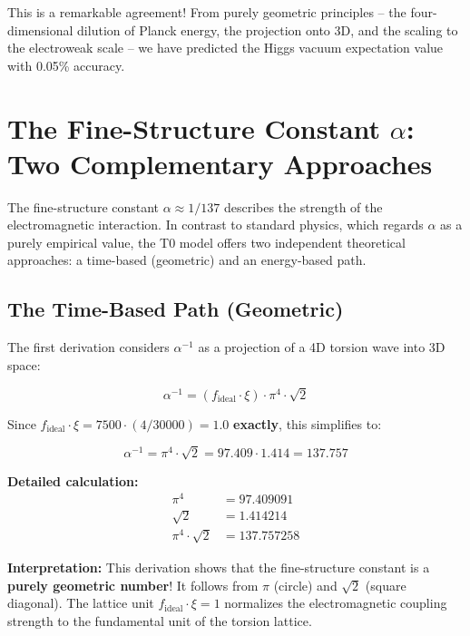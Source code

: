 	This is a remarkable agreement! From purely geometric principles -- the four-dimensional dilution of Planck energy, the projection onto 3D, and the scaling to the electroweak scale -- we have predicted the Higgs vacuum expectation value with 0.05\% accuracy.
	\section{The Fine-Structure Constant \(\alpha\): Two Complementary Approaches}
	
	The fine-structure constant \(\alpha \approx 1/137\) describes the strength of the electromagnetic interaction. In contrast to standard physics, which regards \(\alpha\) as a purely empirical value, the T0 model offers two independent theoretical approaches: a time-based (geometric) and an energy-based path.
	
	\subsection{The Time-Based Path (Geometric)}
	
	The first derivation considers \(\alpha^{-1}\) as a projection of a 4D torsion wave into 3D space:
	
	\begin{equation}
		\boxed{\alpha^{-1} = (f_{\text{ideal}} \cdot \xi) \cdot \pi^4 \cdot \sqrt{2}}
	\end{equation}
	
	Since \(f_{\text{ideal}} \cdot \xi = 7500 \cdot (4/30000) = 1.0\) \textbf{exactly}, this simplifies to:
	
	\begin{equation}
		\alpha^{-1} = \pi^4 \cdot \sqrt{2} = 97.409 \cdot 1.414 = 137.757
	\end{equation}
	
	\textbf{Detailed calculation:}
	\begin{align}
		\pi^4 &= 97.409091 \\
		\sqrt{2} &= 1.414214 \\
		\pi^4 \cdot \sqrt{2} &= 137.757258
	\end{align}
	
	\textbf{Interpretation:} This derivation shows that the fine-structure constant is a \textbf{purely geometric number}! It follows from \(\pi\) (circle) and \(\sqrt{2}\) (square diagonal). The lattice unit \(f_{\text{ideal}} \cdot \xi = 1\) normalizes the electromagnetic coupling strength to the fundamental unit of the torsion lattice.
	
